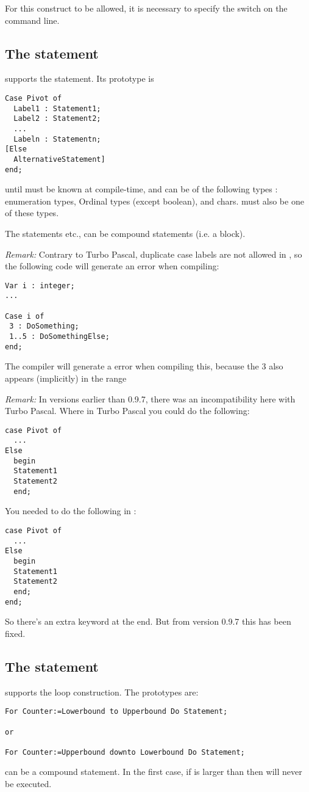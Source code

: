 \documentclass{report}
\begin{document}
For this construct to be allowed, it is necessary to specify the 
switch on the command line.

\subsection{The  statement}
\fpc supports the  statement. Its prototype is
\begin{verbatim}
Case Pivot of
  Label1 : Statement1;
  Label2 : Statement2;
  ...
  Labeln : Statementn;
[Else
  AlternativeStatement]
end;
\end{verbatim}
 until  must be known at compile-time, and can be of
the following types : enumeration types, Ordinal types (except boolean), and
chars.  must also be one of these types.

The statements  etc., can be compound statements (i.e. a
 block).

{\em Remark:} Contrary to Turbo Pascal, duplicate case labels are not
allowed in \fpc, so the following code will generate an error when
compiling:

\begin{verbatim}
Var i : integer;
...

Case i of
 3 : DoSomething;
 1..5 : DoSomethingElse;
end;
\end{verbatim}
The compiler will generate a  error when compiling
this, because the 3 also appears (implicitly) in the range 

{\em Remark:} In versions earlier than 0.9.7, there was an incompatibility here 
with Turbo Pascal. Where in Turbo Pascal you could do the following:
\begin{verbatim}
case Pivot of
  ...
Else
  begin
  Statement1
  Statement2
  end;
\end{verbatim}
You needed to do the following in \fpc :
\begin{verbatim}
case Pivot of
  ...
Else
  begin
  Statement1
  Statement2
  end;
end;
\end{verbatim}
So there's an extra  keyword at the end. But from version 0.9.7
this has been fixed.
\subsection{The  statement}
\fpc supports the  loop construction. The prototypes are:
\begin{verbatim}
For Counter:=Lowerbound to Upperbound Do Statement;

or 

For Counter:=Upperbound downto Lowerbound Do Statement;
\end{verbatim}
 can be a compound statement. In the first case, if
 is larger than  then  will
never be executed.
\end{document}

